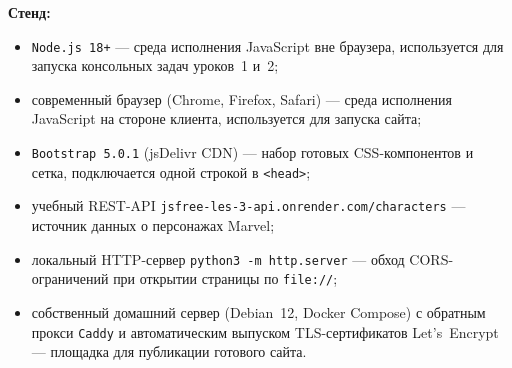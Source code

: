 \textbf{Стенд:}
\begin{itemize}
  \item \texttt{Node.js~18+} --- среда исполнения JavaScript вне
        браузера, используется для запуска консольных задач
        уроков~1 и~2;
  \item современный браузер (Chrome, Firefox, Safari) --- среда
        исполнения JavaScript на стороне клиента, используется для
        запуска сайта;
  \item \texttt{Bootstrap~5.0.1} (jsDelivr CDN) --- набор готовых
        CSS-компонентов и сетка, подключается одной строкой в
        \texttt{<head>};
  \item учебный REST-API
        \texttt{jsfree-les-3-api.onrender.com/characters} ---
        источник данных о персонажах Marvel;
  \item локальный HTTP-сервер \texttt{python3~-m~http.server}
        --- обход CORS-ограничений при открытии страницы по
        \texttt{file://};
  \item собственный домашний сервер (Debian~12, Docker Compose) с
        обратным прокси \texttt{Caddy} и автоматическим выпуском
        TLS-сертификатов Let's~Encrypt --- площадка для публикации
        готового сайта.
\end{itemize}

\endinput
